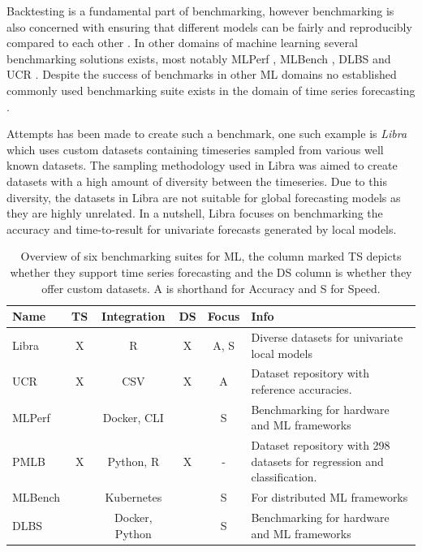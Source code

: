 Backtesting is a fundamental part of benchmarking, however benchmarking is also concerned with ensuring that different models can be fairly and reproducibly compared to each other \cite{huang_benchmarking_2019}. In other domains of machine learning several benchmarking solutions exists, most notably MLPerf \cite{mattson_mlperf_2020}, MLBench \cite{noauthor_mlbench_nodate}, DLBS \cite{vassilieva_deep_nodate} and UCR \cite{dau2019ucr}. Despite the success of benchmarks in other ML domains no established commonly used benchmarking suite exists in the domain of time series forecasting \cite{huang_benchmarking_2019}.

Attempts has been made to create such a benchmark, one such example is \textit{Libra} \cite{bauer2021libra} which uses custom datasets containing timeseries sampled from various well known datasets. The sampling methodology used in Libra was aimed to create datasets with a high amount of diversity between the timeseries. Due to this diversity, the datasets in Libra are not suitable for global forecasting models as they are highly unrelated. In a nutshell, Libra focuses on benchmarking the accuracy and time-to-result for univariate forecasts generated by local models.


\begin{table}[h]
  \begin{tabularx}{\textwidth}{|l|c|c|c|c|X|}
    \hline
    Name    & TS & Integration    & DS & Focus & Info                                                                    \\
    \hline
    \hline
    Libra   & X  & R              & X  & A, S  & Diverse datasets for univariate local models                            \\
    \hline
    UCR     & X  & CSV            & X  & A     & Dataset repository with reference accuracies.                           \\
    \hline
    MLPerf  &    & Docker, CLI    &    & S     & Benchmarking for hardware and ML frameworks                             \\
    \hline
    PMLB    & X  & Python, R      & X  & -     & Dataset repository with 298 datasets for regression and classification. \\
    \hline
    MLBench &    & Kubernetes     &    & S     & For distributed ML frameworks                                           \\
    \hline
    DLBS    &    & Docker, Python &    & S     & Benchmarking for hardware and ML frameworks                             \\
    \hline
  \end{tabularx}
  \caption{Overview of six benchmarking suites for ML, the column marked TS depicts whether they support time series forecasting and the DS column is whether they offer custom datasets. A is shorthand for  Accuracy and S for Speed.}
  \label{tab:benchmarking_suites}
\end{table}

